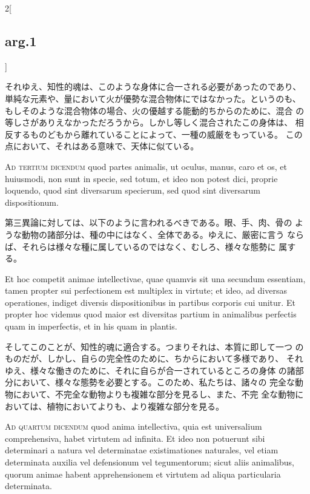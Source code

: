 \documentclass[paper=a4paper,fontsize=10pt,jafontsize=9pt,titlepage]{jlreq}
\begin{document}
\begin{paracol}{2}[\subsection{arg.1}]
 \switchcolumn

 それゆえ、知性的魂は、このような身体に合一される必要があったのであり、
 単純な元素や、量において火が優勢な混合物体にではなかった。というのも、
 もしそのような混合物体の場合、火の優越する能動的ちからのために、混合
 の等しさがありえなかっただろうから。しかし等しく混合されたこの身体は、
 相反するものどもから離れていることによって、一種の威厳をもっている。
 この点において、それはある意味で、天体に似ている。

\switchcolumn*[\subsection{ad 3}]

{\scshape Ad tertium dicendum} quod partes animalis, ut oculus, manus,
caro et os, et huiusmodi, non sunt in specie, sed totum, et ideo non
potest dici, proprie loquendo, quod sint diversarum specierum, sed
quod sint diversarum dispositionum.
 
\switchcolumn

 第三異論に対しては、以下のように言われるべきである。眼、手、肉、骨の
 ような動物の諸部分は、種の中にはなく、全体である。ゆえに、厳密に言う
 ならば、それらは様々な種に属しているのではなく、むしろ、様々な態勢に
 属する。
 
\switchcolumn*

Et hoc competit animae intellectivae, quae quamvis sit una secundum
essentiam, tamen propter sui perfectionem est multiplex in virtute; et
ideo, ad diversas operationes, indiget diversis dispositionibus in
partibus corporis cui unitur. Et propter hoc videmus quod maior est
diversitas partium in animalibus perfectis quam in imperfectis, et in
his quam in plantis.
 
\switchcolumn

 そしてこのことが、知性的魂に適合する。つまりそれは、本質に即して一つ
 のものだが、しかし、自らの完全性のために、ちからにおいて多様であり、
 それゆえ、様々な働きのために、それに自らが合一されているところの身体
 の諸部分において、様々な態勢を必要とする。このため、私たちは、諸々の
 完全な動物において、不完全な動物よりも複雑な部分を見るし、また、不完
 全な動物においては、植物においてよりも、より複雑な部分を見る。
 
\switchcolumn*[\subsection{ad 4}]




 {\scshape Ad quartum dicendum} quod anima intellectiva, quia est
 universalium comprehensiva, habet virtutem ad infinita. Et ideo non
 potuerunt sibi determinari a natura vel determinatae existimationes
 naturales, vel etiam determinata auxilia vel defensionum vel
 tegumentorum; sicut aliis animalibus, quorum animae habent
 apprehensionem et virtutem ad aliqua particularia determinata.


\end{paracol}
\end{document}
